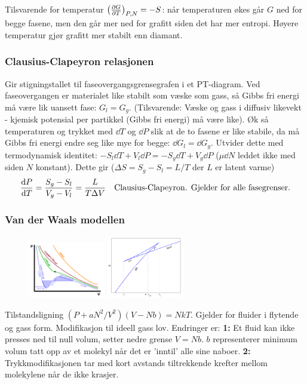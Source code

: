\documentclass[12pt]{article}
\begin{document}
Tilsvarende for temperatur $\left( \pdv{G}{T} \right)_{P,N} = -S$: når temperaturen
økes går $G$ ned for begge fasene, men den går mer ned for grafitt siden det har mer entropi. Høyere
temperatur gjør grafitt mer stabilt enn diamant.
\subsubsection{Clausius-Clapeyron relasjonen}
Gir stigningstallet til faseovergangsgrensegrafen i et PT-diagram. Ved faseovergangen
er materialet like stabilt som væske som gass, så Gibbs fri energi må være lik uansett
fase: $G_l = G_g$. (Tilsvarende: Væske og gass i diffusiv likevekt - kjemisk potensial per partikkel
(Gibbs fri energi) må være like).
Øk så temperaturen og trykket med $\dd T$ og $\dd P$ slik at de to fasene er like
stabile, da må Gibbs fri energi endre seg like mye for begge: $\dd G_l = \dd G_g$.
Utvider dette med termodynamisk identitet: $-S_l \dd T + V_l \dd P = -S_g \dd T + V_g \dd P$
($\mu \dd N$ leddet ikke med siden $N$ konstant). Dette gir ($\Delta S = S_g - S_l = L/T$ der $L$ er latent varme)
\begin{align*}
  \dv{P}{T} = \frac{S_g - S_l}{V_g - V_l} = \frac{L}{T \Delta V} \quad \text{Clausius-Clapeyron. Gjelder for alle fasegrenser.}
\end{align*}
\subsubsection{Van der Waals modellen}
\begin{figure}
  \includegraphics[width=0.3\textwidth]{figures/pV-vdW.png}
  \includegraphics[width=0.3\textwidth]{figures/Van_der_Waals_GibbsP.png}
\end{figure}
Tilstandsligning $(P + aN^2 / V^2) (V-Nb) = NkT$. Gjelder for fluider i flytende og gass form.
Modifikasjon til ideell gass lov. Endringer er: \textbf{1:} Et fluid kan ikke presses ned til null
volum, setter nedre grense $V = Nb$. $b$ representerer minimum volum tatt opp av et molekyl
når det er 'inntil' alle sine naboer. \textbf{2:} Trykkmodifikasjonen tar med kort avstands
tiltrekkende krefter mellom molekylene når de ikke krasjer.
\end{document}
